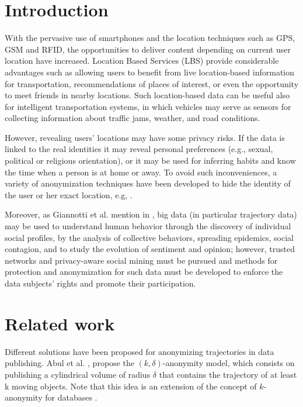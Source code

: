 \documentclass[]{llncs}
\begin{document}
\section{Introduction}

With the pervasive use of smartphones and the location techniques such as GPS, GSM and RFID, the opportunities to deliver content depending on current user location have increased.
Location Based Services (LBS) provide considerable advantages such as allowing users to benefit from live
location-based information for transportation, recommendations of places of interest, or even the opportunity to meet friends in nearby locations. 
Such location-based data can be useful also for intelligent transportation systems, in which vehicles may serve as sensors for collecting information about traffic jams, weather, and road conditions. 


However, revealing users' locations may have some privacy risks. If the data is linked to the real identities it may reveal personal preferences (e.g., sexual, political or religious orientation), or it may be used for inferring habits and know the time when a person is at home or away.
To avoid such inconveniences, a variety of anonymization techniques have been developed to hide the identity of the user or her exact location, e.g, \cite{Terrovitis:2011}.


Moreover, as Giannotti et al. mention in \cite{Giannotti2012}, big data (in particular trajectory data) may be used  to understand human behavior through the discovery of individual social profiles, by the analysis of collective behaviors, spreading epidemics, social contagion, and to study the evolution of sentiment and opinion; however, trusted networks and privacy-aware social mining must be pursued and methods for protection and anonymization for such data must be developed to enforce the data subjects' rights and promote their participation. 

\section{Related work}
Different solutions have been proposed for anonymizing trajectories in data publishing. Abul et al. \cite{Abul2008}, propose the $(k, \delta)$-anonymity model, which consists on publishing a cylindrical volume of radius $\delta$ that contains the trajectory of at least k moving objects. Note that this idea is an extension of the concept of $k$-anonymity for databases \cite{Samarati:1998}.
\end{document}
